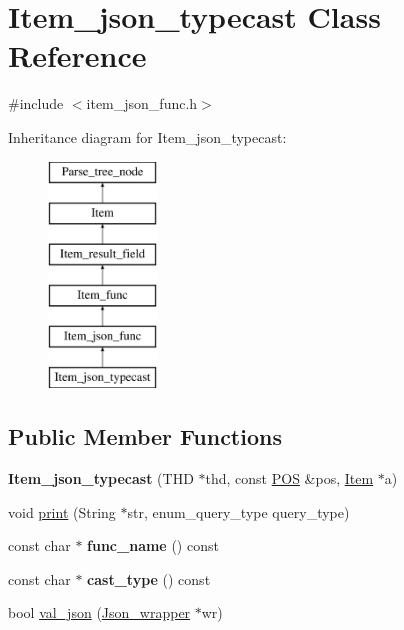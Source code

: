 \hypertarget{classItem__json__typecast}{}\section{Item\+\_\+json\+\_\+typecast Class Reference}
\label{classItem__json__typecast}


{\ttfamily \#include $<$item\+\_\+json\+\_\+func.\+h$>$}

Inheritance diagram for Item\+\_\+json\+\_\+typecast\+:\begin{figure}[H]
\begin{center}
\leavevmode
\includegraphics[height=6.000000cm]{classItem__json__typecast}
\end{center}
\end{figure}
\subsection*{Public Member Functions}
\begin{DoxyCompactItemize}
\item 
\mbox{\label{classItem__json__typecast_aa1c1944e2cf228e0f45d3dc97b7d6730}} 
{\bfseries Item\+\_\+json\+\_\+typecast} (T\+HD $\ast$thd, const \mbox{\hyperlink{structYYLTYPE}{P\+OS}} \&pos, \mbox{\hyperlink{classItem}{Item}} $\ast$a)
\item 
void \mbox{\hyperlink{classItem__json__typecast_a94def4699135226915f3350f5cb6dde7}{print}} (String $\ast$str, enum\+\_\+query\+\_\+type query\+\_\+type)
\item 
\mbox{\label{classItem__json__typecast_a7587dda4f32b7f2c3f20c94670c69c18}} 
const char $\ast$ {\bfseries func\+\_\+name} () const
\item 
\mbox{\label{classItem__json__typecast_a9211af3ee6f86d3d3ed20747effc35d1}} 
const char $\ast$ {\bfseries cast\+\_\+type} () const
\item 
bool \mbox{\hyperlink{classItem__json__typecast_a09e8b9b3ec04c6e654bbb540f47d7b91}{val\+\_\+json}} (\mbox{\hyperlink{classJson__wrapper}{Json\+\_\+wrapper}} $\ast$wr)
\end{DoxyCompactItemize}
